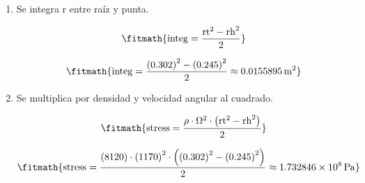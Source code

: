 \begin{enumerate}

\item Se integra r entre raíz y punta.

\[\fitmath{\mathrm{integ}=\frac{{\mathrm{rt}}^{2}-{\mathrm{rh}}^{2}}{2}}\]

\[\fitmath{\mathrm{integ}=\frac{{(0.302)}^{2}-{(0.245)}^{2}}{2}\approx 0.0155895\,\mathrm{m^{2}}}\]

\item Se multiplica por densidad y velocidad angular al cuadrado.

\[\fitmath{\mathrm{stress}=\frac{\rho\cdot {\Omega}^{2}\cdot \left({\mathrm{rt}}^{2}-{\mathrm{rh}}^{2}\right)}{2}}\]

\[\fitmath{\mathrm{stress}=\frac{(8120)\cdot {(1170)}^{2}\cdot \left({(0.302)}^{2}-{(0.245)}^{2}\right)}{2}\approx 1.732846\times10^{8}\,\mathrm{Pa}}\]

\end{enumerate}
